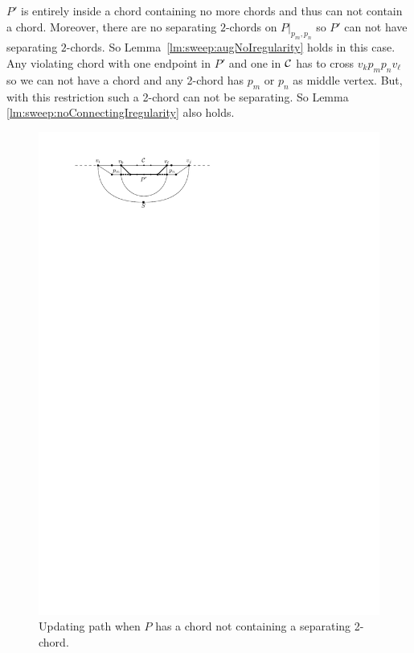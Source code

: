       $P'$ is entirely inside a chord containing no more chords and thus can not contain a chord.
      Moreover, there are no separating $2$-chords on $P|_{p_m, p_n}$ so $P'$ can not have separating $2$-chords.
      So Lemma~\ref{lm:sweep:augNoIregularity} holds in this case.
      Any violating chord with one endpoint in $P'$ and one in $\mathcal{C}$ has to cross $v_k p_m p_n v_\ell$ so we can not have a chord and any 2-chord has $p_m$ or $p_n$ as middle vertex.
      But, with this restriction such a 2-chord can not be separating.
      So Lemma \ref{lm:sweep:noConnectingIregularity} also holds.

      \begin{figure}[!b]
        \centering
        \includegraphics[scale=1]{unifiedAlgo/img/sweep/cases/chordUpdate}
        \caption{Updating path when $P$ has a chord not containing a separating 2-chord.}
        \label{fig:sweep:chordUpdate}

\end{figure}
